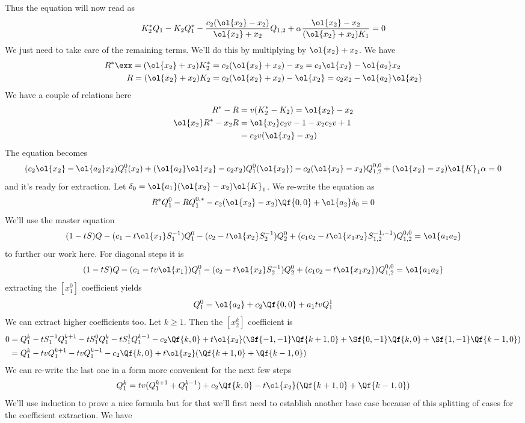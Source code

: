 Thus the equation will now read as
\[
   K_2^\ast Q_1 - K_2 Q_1^\ast -\frac{c_2(\ol{x_2}-x_2)}{\ol{x_2}+x_2}Q_{1,2}+\alpha\frac{\ol{x_2}-x_2}{(\ol{x_2}+x_2)K_1}= 0
\]
We just need to take care of the remaining terms. We'll do this by multiplying by $\ol{x_2}+x_2$. We have
\begin{align*}
R^\ast \exx= (\ol{x_2}+x_2) K_2^\ast &= c_2(\ol{x_2}+x_2)-x_2 = c_2\ol{x_2}-\ol{a_2}x_2\\
R = (\ol{x_2}+x_2) K_2 &= c_2(\ol{x_2}+x_2)-\ol{x_2} = c_2x_2-\ol{a_2}\ol{x_2}\\
\end{align*}
We have a couple of relations here
\begin{align*}
R^\ast - R &= v(K_2^\ast-K_2) = \ol{x_2}-x_2\\
\ol{x_2}R^\ast - x_2 R &= \ol{x_2}c_2v-1- x_2 c_2v+1 \\
& = c_2v(\ol{x_2}-x_2)
\end{align*}
The equation becomes
\[
(c_2\ol{x_2}-\ol{a_2}x_2)Q_1^0(x_2)+ (\ol{a_2}\ol{x_2}-c_2x_2) Q_1^0(\ol{x_2}) - c_2(\ol{x_2}-x_2)Q_{1,2}^{0,0}+(\ol{x_2}-x_2)\ol{K}_1\alpha = 0
\]
and it's ready for extraction. Let $\delta_0 = \ol{a_1}(\ol{x_2}-x_2)\ol{K}_1$. We re-write the equation as
\[\label{zero-order}
    R^\ast Q_1^0 -R Q_1^{0,\ast} - c_2(\ol{x_2}-x_2)\Qf{0,0} +\ol{a_2}\delta_0 = 0
\]
We'll use the master equation
\[
 (1-tS)Q - (c_1-t\ol{x_1}S_1^{-1}) Q_1^0- (c_2-t\ol{x_2}S_2^{-1}) Q_2^0+ (c_1c_2-t\ol{x_1x_2}S_{1,2}^{-1,-1})Q_{1,2}^{0,0}  = \ol{a_1a_2}
\]
to further our work here. For diagonal steps it is
\[
 (1-tS)Q - (c_1-tv\ol{x_1}) Q_1^0- (c_2-t\ol{x_2}S_2^{-1}) Q_2^0+ (c_1c_2-t\ol{x_1x_2})Q_{1,2}^{0,0}  = \ol{a_1a_2}
\]
extracting the $[x_1^0]$ coefficient yields
\[
   Q_1^0 = \ol{a_2}+c_2\Qf{0,0} + a_1tvQ_1^1
\]
We can extract higher coefficients too. Let $k\geq 1$. Then the $[x_2^k]$ coefficient is
\begin{align*}
0 &= Q_1^k-tS_{1}^{-1}Q_1^{k+1}-tS_1^{0}Q_1^k-tS_1^1Q_1^{k-1}-c_2\Qf{k,0} + t\ol{x_2}(\Sf{-1,-1}\Qf{k+1,0}+\Sf{0,-1}\Qf{k,0}+\Sf{1,-1}\Qf{k-1,0})\\
&=Q_1^k-tvQ_1^{k+1}-tvQ_1^{k-1}-c_2\Qf{k,0} + t\ol{x_2}(\Qf{k+1,0}+\Qf{k-1,0})
\end{align*}
We can re-write the last one in a form more convenient for the next few steps
\[\label{formula}
   Q_1^k = tv(Q_1^{k+1}+Q_1^{k-1}) + c_2 \Qf{k,0} - t\ol{x_2}(\Qf{k+1,0}+\Qf{k-1,0})
\]
We'll use induction to prove a nice formula but for that we'll first need to establish another base case because of this splitting of cases for the coefficient extraction. We have
